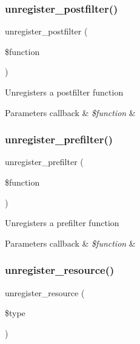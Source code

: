 \subsubsection{\texorpdfstring{unregister\+\_\+postfilter()}{unregister\_postfilter()}}
{\footnotesize\ttfamily unregister\+\_\+postfilter (\begin{DoxyParamCaption}\item[{}]{\$function }\end{DoxyParamCaption})}

Unregisters a postfilter function


\begin{DoxyParams}[1]{Parameters}
callback & {\em \$function} & \\
\hline
\end{DoxyParams}
\mbox{\label{class_smarty_a8208fd226842f48de08ce37305295d64}} 
\subsubsection{\texorpdfstring{unregister\+\_\+prefilter()}{unregister\_prefilter()}}
{\footnotesize\ttfamily unregister\+\_\+prefilter (\begin{DoxyParamCaption}\item[{}]{\$function }\end{DoxyParamCaption})}

Unregisters a prefilter function


\begin{DoxyParams}[1]{Parameters}
callback & {\em \$function} & \\
\hline
\end{DoxyParams}
\mbox{\label{class_smarty_a509d4408ce20f6def85118984b81a32e}} 
\subsubsection{\texorpdfstring{unregister\+\_\+resource()}{unregister\_resource()}}
{\footnotesize\ttfamily unregister\+\_\+resource (\begin{DoxyParamCaption}\item[{}]{\$type }\end{DoxyParamCaption})}

